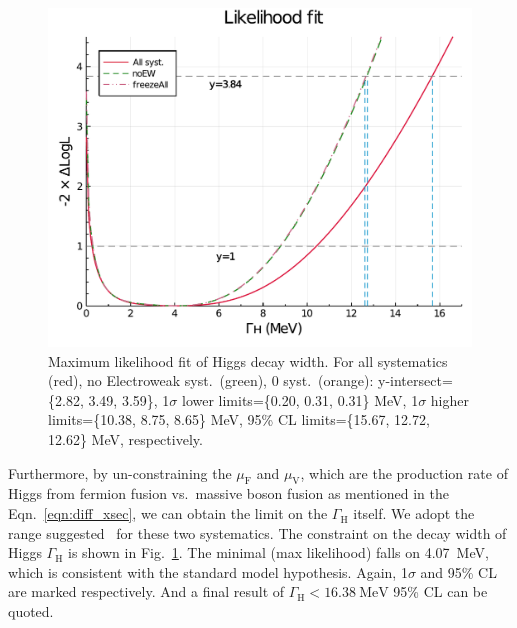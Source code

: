 \begin{figure}[h]
    \centering
    \includegraphics[width=.8\linewidth]{fig/Final_fit_width.pdf}
    \caption{Maximum likelihood fit of Higgs decay width. For all systematics (red), no Electroweak syst.~(green),
    0 syst.~(orange): y-intersect=\{2.82, 3.49, 3.59\}, 1$\sigma$ lower limits=\{0.20, 0.31, 0.31\} MeV,
1$\sigma$ higher limits=\{10.38, 8.75, 8.65\} MeV, 95\% CL limits=\{15.67, 12.72, 12.62\} MeV, respectively.}
\label{fig:final_fit_width}
\end{figure}
Furthermore, by un-constraining the $\mu_\mathrm{F}$ and $\mu_\mathrm{V}$, which are the production rate
of Higgs from fermion fusion vs.\ massive boson fusion as mentioned in the Eqn.~\ref{eqn:diff_xsec}, we can
obtain the limit on the $\Gamma_\mathrm{H}$ itself.
We adopt the range suggested~\cite{rfrv_higgs_pas} for these two systematics. The constraint on the decay width of Higgs $\Gamma_\mathrm{H}$ is shown in 
Fig.~\ref{fig:final_fit_width}. The minimal (max likelihood) falls on \SI{4.07}{\mega\electronvolt},
which is consistent with the standard model hypothesis.
Again, 1$\sigma$ and 95\% CL are marked respectively. And a final result of 
$\Gamma_\mathrm{H}<\SI{16.38}{\mega\electronvolt}$ 95\% CL can be quoted.


